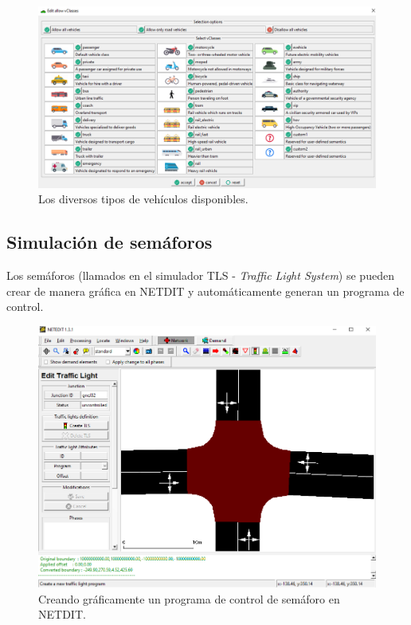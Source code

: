 \begin{figure}[h]
    \centering
\includegraphics[width=\textwidth]{sumo/d600ef6ce1de01e90d10a436d7b6bb75.png}
    \caption{Los diversos tipos de vehículos disponibles.}
    \label{fig:sumogui2}
\end{figure}

\hypertarget{simulaciuxf3n-de-semuxe1foros}{%
\subsection{Simulación de
semáforos}\label{simulaciuxf3n-de-semuxe1foros}}

Los semáforos (llamados en el simulador TLS - \emph{Traffic Light
System}) se pueden crear de manera gráfica en NETDIT y automáticamente
generan un programa de control.

\begin{figure}[h]
    \centering
\includegraphics[width=\textwidth]{sumo/d53e12f08f94d08fd7e31f214786b43e.png}
    \caption{Creando gráficamente un programa de control de semáforo en NETDIT.}
    \label{fig:netedit2}
\end{figure}

